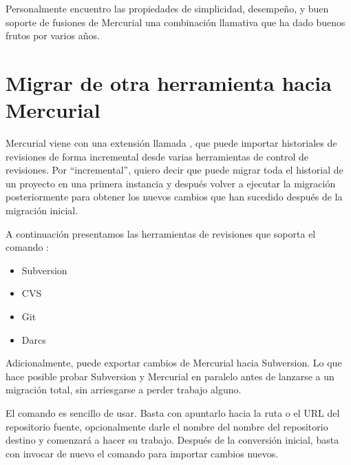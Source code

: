 Personalmente encuentro las propiedades de simplicidad, desempeño, y
buen soporte de fusiones de Mercurial una combinación llamativa que ha
dado buenos frutos por varios años.


\section{Migrar de otra herramienta hacia Mercurial}

Mercurial viene con una extensión llamada , que puede
importar historiales de revisiones de forma incremental desde varias
herramientas de control de revisiones. Por ``incremental'', quiero
decir que puede migrar toda el historial de un proyecto en una primera
instancia y después volver a ejecutar la migración posteriormente para
obtener los nuevos cambios que han sucedido después de la migración
inicial.

A continuación presentamos las herramientas de revisiones que soporta
el comando :
\begin{itemize}
\item Subversion
\item CVS
\item Git
\item Darcs
\end{itemize}

Adicionalmente,  puede exportar cambios de Mercurial
hacia Subversion.  Lo que hace posible probar Subversion y Mercurial
en paralelo antes de lanzarse a un migración total, sin arriesgarse a
perder trabajo alguno.

El comando  es sencillo de usar. Basta con
apuntarlo hacia la ruta o el URL del repositorio fuente, opcionalmente
darle el nombre del nombre del repositorio destino y comenzará a hacer
su trabajo. Después de la conversión inicial, basta con invocar de
nuevo el comando para importar cambios nuevos.


